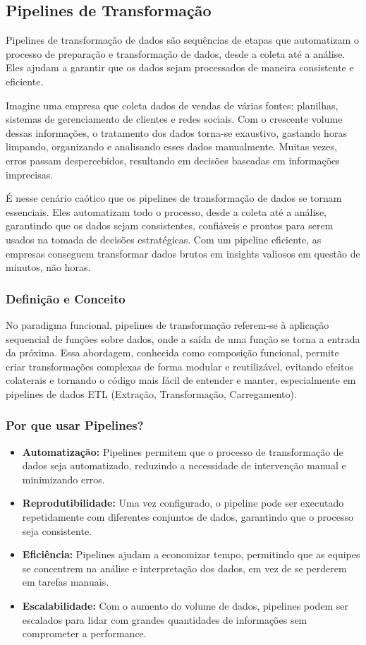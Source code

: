 \subsection{Pipelines de Transformação}
Pipelines de transformação de dados são sequências de etapas que automatizam o processo de preparação e transformação de dados, desde a coleta até a análise. Eles ajudam a garantir que os dados sejam processados de maneira consistente e eficiente.

Imagine uma empresa que coleta dados de vendas de várias fontes: planilhas, sistemas de gerenciamento de clientes e redes sociais. Com o crescente volume dessas informações, o tratamento dos dados torna-se exaustivo, gastando horas limpando, organizando e analisando esses dados manualmente. Muitas vezes, erros passam despercebidos, resultando em decisões baseadas em informações imprecisas.

É nesse cenário caótico que os pipelines de transformação de dados se tornam essenciais. Eles automatizam todo o processo, desde a coleta até a análise, garantindo que os dados sejam consistentes, confiáveis e prontos para serem usados na tomada de decisões estratégicas. Com um pipeline eficiente, as empresas conseguem transformar dados brutos em insights valiosos em questão de minutos, não horas.

\subsubsection{Definição e Conceito}
No paradigma funcional, pipelines de transformação referem-se à aplicação sequencial de funções sobre dados, onde a saída de uma função se torna a entrada da próxima. Essa abordagem, conhecida como composição funcional, permite criar transformações complexas de forma modular e reutilizável, evitando efeitos colaterais e tornando o código mais fácil de entender e manter, especialmente em pipelines de dados ETL (Extração, Transformação, Carregamento).

\subsubsection{Por que usar Pipelines?}
\begin{itemize}
    \item \textbf{Automatização:} Pipelines permitem que o processo de transformação de dados seja automatizado, reduzindo a necessidade de intervenção manual e minimizando erros.
    \item \textbf{Reprodutibilidade:} Uma vez configurado, o pipeline pode ser executado repetidamente com diferentes conjuntos de dados, garantindo que o processo seja consistente.
    \item \textbf{Eficiência:} Pipelines ajudam a economizar tempo, permitindo que as equipes se concentrem na análise e interpretação dos dados, em vez de se perderem em tarefas manuais.
    \item \textbf{Escalabilidade:} Com o aumento do volume de dados, pipelines podem ser escalados para lidar com grandes quantidades de informações sem comprometer a performance.
\end{itemize}

